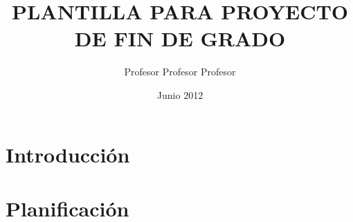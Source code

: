 \documentclass[a4paper,11pt]{book}
\title{PLANTILLA PARA PROYECTO DE FIN DE GRADO}
\author{Profesor Profesor Profesor}
\date{Junio 2012}
\begin{document}
\renewcommand{\listtablename}{Índice de tablas}
\renewcommand{\tablename}{Tabla}


\pagestyle{empty}

\cleardoublepage


\cleardoublepage


\newpage


\newpage


\frontmatter
\pagestyle{plain}

\tableofcontents
\listoffigures
\listoftables

\mainmatter




\chapter{Introducción}


\chapter{Planificación}

\end{document}
